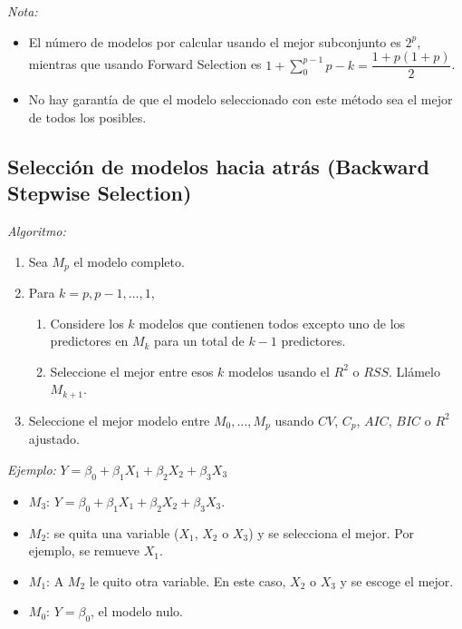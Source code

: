 \documentclass[
  12pt,
]{book}
\providecommand{\tightlist}{%
  \setlength{\itemsep}{0pt}\setlength{\parskip}{0pt}}
\theoremstyle{definition}
\theoremstyle{definition}
\theoremstyle{definition}
\theoremstyle{definition}
\theoremstyle{remark}
\begin{document}
\emph{Nota:}

\begin{itemize}
\item
  El número de modelos por calcular usando el mejor subconjunto es \(2^p\), mientras que usando Forward Selection es \(1+\displaystyle\sum_0^ {p-1} p-k = \dfrac{1+p(1+p)}2\).
\item
  No hay garantía de que el modelo seleccionado con este método sea el mejor de todos los posibles.
\end{itemize}

\hypertarget{selecciuxf3n-de-modelos-hacia-atruxe1s-backward-stepwise-selection}{%
\subsection{\texorpdfstring{Selección de modelos hacia atrás (\textbf{Backward Stepwise Selection})}{Selección de modelos hacia atrás (Backward Stepwise Selection)}}\label{selecciuxf3n-de-modelos-hacia-atruxe1s-backward-stepwise-selection}}

\emph{Algoritmo:}

\begin{enumerate}
\def\labelenumi{\arabic{enumi}.}
\tightlist
\item
  Sea \(M_p\) el modelo completo.
\item
  Para \(k=p,p-1,\dots,1\),

  \begin{enumerate}
  \def\labelenumii{\alph{enumii}.}
  \tightlist
  \item
    Considere los \(k\) modelos que contienen todos excepto uno de los predictores en \(M_k\) para un total de \(k-1\) predictores.
  \item
    Seleccione el mejor entre esos \(k\) modelos usando el \(R^2\) o \(RSS\). Llámelo \(M_{k+1}\).
  \end{enumerate}
\item
  Seleccione el mejor modelo entre \(M_0,\dots,M_p\) usando \(CV\), \(C_p\), \(AIC\), \(BIC\) o \(R^2\) ajustado.
\end{enumerate}

\emph{Ejemplo:} \(Y=\beta_0+\beta_1X_1+\beta_2X_2+\beta_3X_3\)

\begin{itemize}
\item
  \(M_3\): \(Y = \beta_0 +\beta_1X_1+\beta_2X_2+\beta_3X_3\).
\item
  \(M_2\): se quita una variable (\(X_1\), \(X_2\) o \(X_3\)) y se selecciona el mejor. Por ejemplo, se remueve \(X_1\).
\item
  \(M_1\): A \(M_{2}\) le quito otra variable. En este caso, \(X_2\) o \(X_3\) y se escoge el mejor.
\item
  \(M_0\): \(Y=\beta_0\), el modelo nulo.
\end{itemize}
\end{document}
